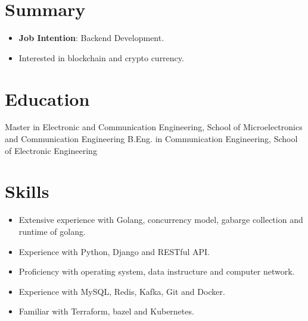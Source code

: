 \documentclass{CV}
\begin{document}



\section{Summary}
\begin{itemize}
    \item {\textbf{Job Intention}}: Backend Development.
    \item Interested in blockchain and crypto currency.
\end{itemize}

\section{Education}
Master in Electronic and Communication Engineering, School of Microelectronics and Communication Engineering
B.Eng. in Communication Engineering, School of Electronic Engineering

\section{Skills}
\begin{itemize}
    \item Extensive experience with Golang, concurrency model, gabarge collection and runtime of golang.
    \item Experience with Python, Django and RESTful API.
    \item Proficiency with operating system, data instructure and computer network.
    \item Experience with MySQL, Redis, Kafka, Git and Docker.
    \item Familiar with Terraform, bazel and Kubernetes.
\end{itemize}
\end{document}
